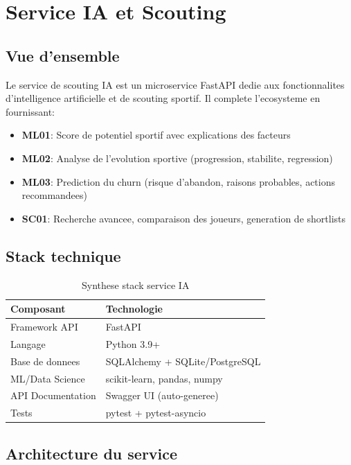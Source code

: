 \chapter{Service IA et Scouting}

\section{Vue d'ensemble}

Le service de scouting IA est un microservice FastAPI dedie aux fonctionnalites d'intelligence artificielle et de scouting sportif. Il complete l'ecosysteme en fournissant:

\begin{itemize}[leftmargin=*]
  \item \textbf{ML01}: Score de potentiel sportif avec explications des facteurs
  \item \textbf{ML02}: Analyse de l'evolution sportive (progression, stabilite, regression)
  \item \textbf{ML03}: Prediction du churn (risque d'abandon, raisons probables, actions recommandees)
  \item \textbf{SC01}: Recherche avancee, comparaison des joueurs, generation de shortlists
\end{itemize}

\section{Stack technique}

\begin{table}[H]
\centering
\begin{tabular}{p{} p{}}
\toprule
\textbf{Composant} & \textbf{Technologie} \\
\midrule
Framework API & FastAPI \\
Langage & Python 3.9+ \\
Base de donnees & SQLAlchemy + SQLite/PostgreSQL \\
ML/Data Science & scikit-learn, pandas, numpy \\
API Documentation & Swagger UI (auto-generee) \\
Tests & pytest + pytest-asyncio \\
\bottomrule
\end{tabular}
\caption{Synthese stack service IA}
\end{table}

\section{Architecture du service}

